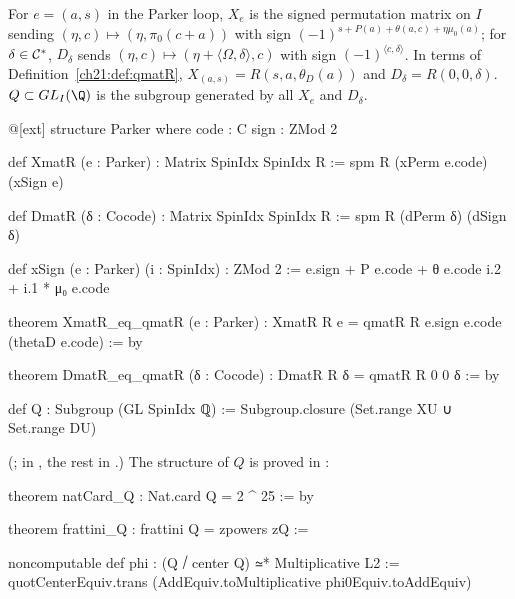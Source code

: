 \begin{definition}\label{ch21:def:Q}
For $e=(a,s)$ in the Parker loop, $X_e$ is the signed permutation matrix on $I$ sending
$(\eta,c)\mapsto(\eta,\pi_0(c+a))$ with sign $(-1)^{s+P(a)+\theta(a,c)+\eta\mu_0(a)}$; for
$\delta\in\mathcal{C}^*$, $D_\delta$ sends $(\eta,c)\mapsto(\eta+\langle\Omega,\delta\rangle,c)$ with sign
$(-1)^{\langle c,\delta\rangle}$.  In terms of Definition~\ref{ch21:def:qmatR},
$X_{(a,s)}=R(s,a,\theta_D(a))$ and $D_\delta=R(0,0,\delta)$.  $Q\subset GL_I(\Q)$ is the subgroup
generated by all $X_e$ and $D_\delta$.
\end{definition}
\begin{leancode}
@[ext] structure Parker where
  code : C
  sign : ZMod 2
\end{leancode}
\begin{leancode}
def XmatR (e : Parker) : Matrix SpinIdx SpinIdx R := spm R (xPerm e.code) (xSign e)

def DmatR (δ : Cocode) : Matrix SpinIdx SpinIdx R := spm R (dPerm δ) (dSign δ)
\end{leancode}
\begin{leancode}
def xSign (e : Parker) (i : SpinIdx) : ZMod 2 :=
  e.sign + P e.code + θ e.code i.2 + i.1 * μ₀ e.code
\end{leancode}
\begin{leancode}
theorem XmatR_eq_qmatR (e : Parker) : XmatR R e = qmatR R e.sign e.code (thetaD e.code) := by
\end{leancode}
\begin{leancode}
theorem DmatR_eq_qmatR (δ : Cocode) : DmatR R δ = qmatR R 0 0 δ := by
\end{leancode}
\begin{leancode}
def Q : Subgroup (GL SpinIdx ℚ) := Subgroup.closure (Set.range XU ∪ Set.range DU)
\end{leancode}
(;  in , the rest in
.)  The structure of $Q$ is proved in :
\begin{leancode}
theorem natCard_Q : Nat.card Q = 2 ^ 25 := by
\end{leancode}
\begin{leancode}
theorem frattini_Q : frattini Q = zpowers zQ :=
\end{leancode}
\begin{leancode}
noncomputable def phi : (Q ⧸ center Q) ≃* Multiplicative L2 :=
  quotCenterEquiv.trans (AddEquiv.toMultiplicative phi0Equiv.toAddEquiv)
\end{leancode}
